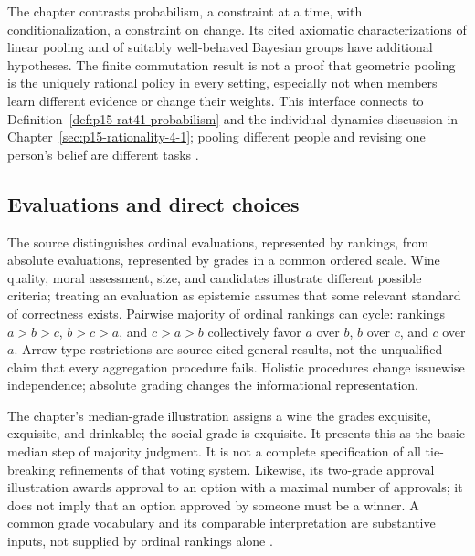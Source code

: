The chapter contrasts probabilism, a constraint at a time, with
conditionalization, a constraint on change. Its cited axiomatic
characterizations of linear pooling and of suitably well-behaved Bayesian
groups have additional hypotheses. The finite commutation result is not
a proof that geometric pooling is the uniquely rational policy in every
setting, especially not when members learn different evidence or change
their weights. This interface connects to
Definition~\ref{def:p15-rat41-probabilism} and the individual dynamics
discussion in Chapter~\ref{sec:p15-rationality-4-1}; pooling different
people and revising one person's belief are different tasks
\parencite[p.~582]{DietrichSpiekermann2021Social}.

\subsection{Evaluations and direct choices}

The source distinguishes ordinal evaluations, represented by rankings,
from absolute evaluations, represented by grades in a common ordered
scale. Wine quality, moral assessment, size, and candidates illustrate
different possible criteria; treating an evaluation as epistemic assumes
that some relevant standard of correctness exists. Pairwise majority of
ordinal rankings can cycle: rankings \(a>b>c\), \(b>c>a\), and
\(c>a>b\) collectively favor \(a\) over \(b\), \(b\) over \(c\),
and \(c\) over \(a\). Arrow-type restrictions are source-cited
general results, not the unqualified claim that every aggregation
procedure fails. Holistic procedures change issuewise independence;
absolute grading changes the informational representation.

The chapter's median-grade illustration assigns a wine the grades
exquisite, exquisite, and drinkable; the social grade is exquisite.
It presents this as the basic median step of majority judgment. It is
not a complete specification of all tie-breaking refinements of that
voting system. Likewise, its two-grade approval illustration awards
approval to an option with a maximal number of approvals; it does not
imply that an option approved by someone must be a winner. A common
grade vocabulary and its comparable interpretation are substantive
inputs, not supplied by ordinal rankings alone
\parencite[pp.~582--583]{DietrichSpiekermann2021Social}.

